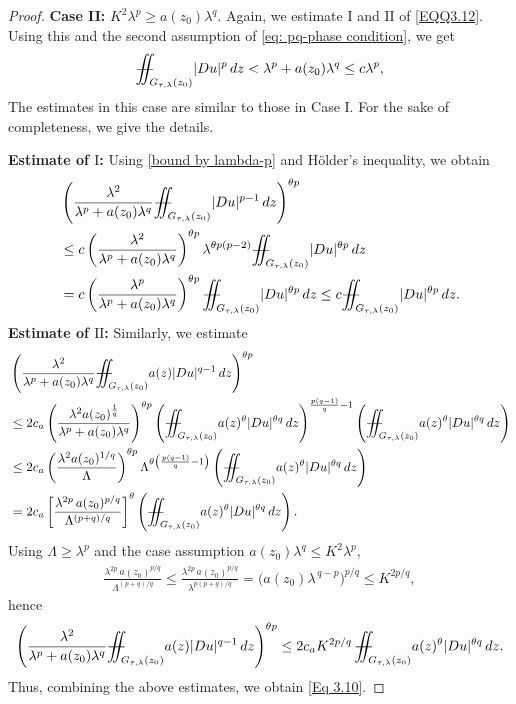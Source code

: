 \documentclass[notitlepage,11pt,reqno]{amsart}
\theoremstyle{definition}
\numberwithin{equation}{section}
\newcommand{\iintss}{{\int\hspace{-0.28cm}\int}}
\newcommand{ \miints }{{\iintss\hspace{-0.56cm} -\hspace{-0.15cm}-}}
\newcommand{\miint}[1]{{\miints_{\hspace{-0.13cm}#1}}}
\begin{document}
\begin{proof}
\noindent\textbf{Case II:} $K^2\lambda^p\geq a(z_0)\lambda^q.$ Again, we estimate $\mathrm{I}$ and $\mathrm{II}$ of \eqref{EQQ3.12}. Using this and the second assumption of \eqref{eq: pq-phase condition}, we get
\begin{align}\label{bound by lambda-p}
    \miint{G_{\tau, \lambda}(z_0)}|Du|^p\,dz< \lambda^p+a(z_0)\lambda^q\leq c \lambda^p,
\end{align}
The estimates in this case are similar to those in Case I. For the sake of completeness, we give the details.

\noindent \textbf{Estimate of $\mathrm{I}$:} Using \eqref{bound by lambda-p} and H\"{o}lder's inequality, we obtain
\begin{align*}
    &\left(\frac{\lambda^2}{\lambda^p+a(z_0)\lambda^q}\miint{G_{\tau, \lambda}(z_0)}|Du|^{p-1}\,dz\right)^{\theta p}\\
    & \leq c \left(\frac{\lambda^2}{\lambda^p+a(z_0)\lambda^q}\right)^{\theta p}\lambda^{\theta p (p-2)} \miint{G_{\tau, \lambda}(z_0)}|Du|^{\theta p}\, dz\\
    &=c\left(\frac{\lambda^p}{\lambda^p+a(z_0)\lambda^q}\right)^{\theta p} \miint{G_{\tau, \lambda}(z_0)}|Du|^{\theta p}\, dz \leq c\miint{G_{\tau, \lambda}(z_0)}|Du|^{\theta p}\, dz.
\end{align*}
\textbf{Estimate of $\mathrm{II}$:} Similarly, we estimate
\begin{align*}
 &\left(\frac{\lambda^2}{\lambda^p+a(z_0)\lambda^q}\miint{G_{\tau, \lambda}(z_0)}a(z)|Du|^{q-1}\,dz\right)^{\theta p}\\
&\leq2c_a \left(\frac{\lambda^2 a(z_0)^{\frac{1}{q}}}{\lambda^p+a(z_0)\lambda^q}\right)^{\theta p} \left(\miint{G_{\tau, \lambda}(z_0)}a(z)^{\theta}|Du|^{\theta q}\, dz\right)^{\frac{p(q-1)}{q}-1}\left(\miint{G_{\tau, \lambda}(z_0)}a(z)^{\theta}|Du|^{\theta q}\, dz\right)\\
    &\leq 2c_a\left(\frac{\lambda^{2}a(z_0)^{1/q}}{\Lambda}\right)^{\theta p}\Lambda^{\theta\left(\frac{p(q-1)}{q}-1\right)}
        \left(\miint{G_{\tau,\lambda}(z_0)} a(z)^{\theta}|Du|^{\theta q}\,dz\right)
    \notag\\
    &= 2c_a\left[\frac{\lambda^{2p}\,a(z_0)^{p/q}}{\Lambda^{(p+q)/q}}\right]^{\theta}
        \left(\miint{G_{\tau,\lambda}(z_0)} a(z)^{\theta}|Du|^{\theta q}\,dz\right).
\end{align*}
Using $\Lambda\geq\lambda^{p}$ and the case assumption $a(z_0)\lambda^{q}\leq K^{2}\lambda^{p}$,
\begin{align*}
    \frac{\lambda^{2p}\,a(z_0)^{p/q}}{\Lambda^{(p+q)/q}}
    \leq\frac{\lambda^{2p}\,a(z_0)^{p/q}}{\lambda^{p(p+q)/q}}
    =\bigl(a(z_0)\lambda^{\,q-p}\bigr)^{p/q}\leq K^{2p/q},
\end{align*}
hence
\begin{align*}
    \left(\frac{\lambda^{2}}{\lambda^{p}+a(z_0)\lambda^{q}}
        \miint{G_{\tau,\lambda}(z_0)} a(z)|Du|^{q-1}\,dz\right)^{\theta p}
    \leq 2c_aK^{2p/q}\,\miint{G_{\tau,\lambda}(z_0)} a(z)^{\theta}|Du|^{\theta q}\,dz.
\end{align*}
Thus, combining the above estimates, we obtain \eqref{Eq 3.10}.


\end{proof}
\end{document}
